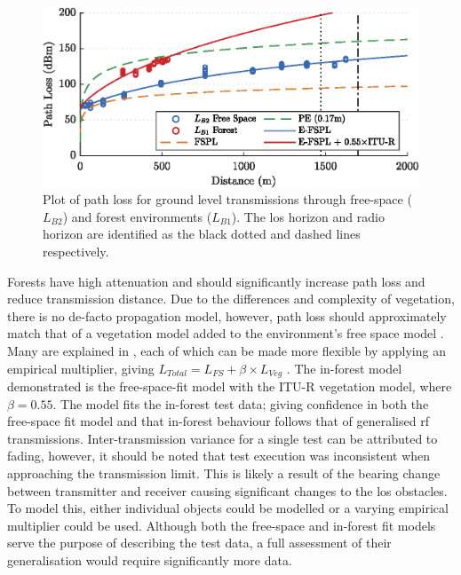 \begin{figure}[H]
    \centering
   	\includegraphics{Figures/distance_pl_plot}
    \caption[Effect of Distance on ground level Path Loss]{
    	Plot of path loss for ground level transmissions through free-space ($L_{B2}$) and forest environments ($L_{B1}$). The \ac{los} horizon and radio horizon are identified as the black dotted and dashed lines respectively.
    }
    \label{fig:distance_pl_plot}
\end{figure}
\vspace{-5mm}
Forests have high attenuation and should significantly increase path loss and reduce transmission distance. Due to the differences and complexity of vegetation, there is no de-facto propagation model, however, path loss should approximately match that of a vegetation model added to the environment's free space model \cite{3YP:COMBINING_MODELS}.  Many are explained in \cite{3YP:PROP_MODELS}, each of which can be made more flexible by applying an empirical multiplier, giving $L_{Total} = L_{FS} + \beta \times L_{Veg}$ \cite{3YP:EMPIRICAL_MULTIPLIER}. The in-forest model demonstrated is the free-space-fit model with the ITU-R vegetation model, where $\beta=0.55$. The model fits the in-forest test data; giving confidence in both the free-space fit model and that in-forest behaviour follows that of generalised \ac{rf} transmissions. Inter-transmission variance for a single test can be attributed to fading, however, it should be noted that test execution was inconsistent when approaching the transmission limit. This is likely a result of the bearing change between transmitter and receiver causing significant changes to the \ac{los} obstacles. To model this, either individual objects could be modelled or a varying empirical multiplier could be used. Although both the free-space and in-forest fit models serve the purpose of describing the test data, a full assessment of their generalisation would require significantly more data.


